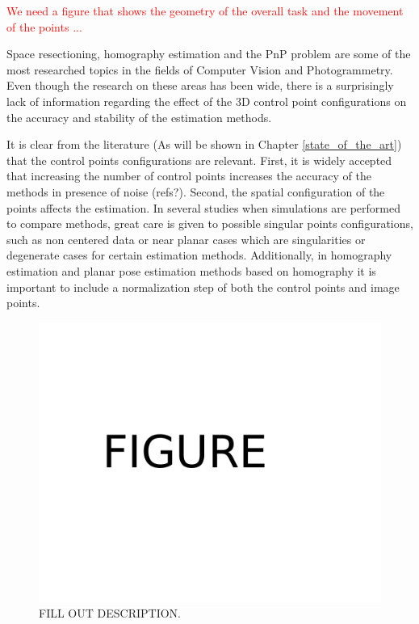 \documentclass[letterpaper, 10 pt, conference]{ieeeconf}  %
\begin{document}
	\textcolor{red}{We need a figure that shows the geometry of the overall task and the movement of the points ...}
	
	Space resectioning, homography estimation and the PnP problem are some of the most researched topics in the fields of Computer Vision and Photogrammetry. Even though the research on these areas has been wide, there is a surprisingly lack of information regarding the effect of the 3D control point configurations on the accuracy and stability of the estimation methods.
	
	It is clear from the literature (As will be shown in Chapter \ref{state_of_the_art}) that the control points configurations are relevant. First, it is widely accepted that increasing the number of control points increases the accuracy of the methods in presence of noise (refs?). Second, the spatial configuration of the points affects the estimation. In several studies when simulations are performed to compare methods, great care is given to possible singular points configurations, such as non centered data or near planar cases which are singularities or degenerate cases for certain estimation methods. Additionally, in homography estimation and planar pose estimation methods based on homography it is important to include a normalization step of both the control points and image points. 
	
	\begin{figure}[t]
		\begin{center}
			\includegraphics[width=\columnwidth]{img/intro_figure.pdf}
			\caption{\label{fig:intro_figure} FILL OUT DESCRIPTION.}
		\end{center}
	\end{figure}
	
\end{document}
